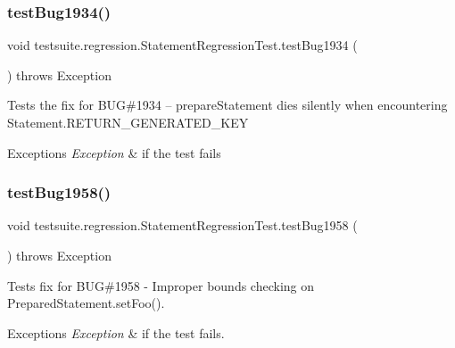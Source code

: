 \subsubsection{\texorpdfstring{test\+Bug1934()}{testBug1934()}}
{\footnotesize\ttfamily void testsuite.\+regression.\+Statement\+Regression\+Test.\+test\+Bug1934 (\begin{DoxyParamCaption}{ }\end{DoxyParamCaption}) throws Exception}

Tests the fix for B\+UG\#1934 -- prepare\+Statement dies silently when encountering Statement.\+R\+E\+T\+U\+R\+N\+\_\+\+G\+E\+N\+E\+R\+A\+T\+E\+D\+\_\+\+K\+EY


\begin{DoxyExceptions}{Exceptions}
{\em Exception} & if the test fails \\
\hline
\end{DoxyExceptions}
\mbox{\label{classtestsuite_1_1regression_1_1_statement_regression_test_a83011075c00abbedc8e7d79f2ffb6661}} 
\subsubsection{\texorpdfstring{test\+Bug1958()}{testBug1958()}}
{\footnotesize\ttfamily void testsuite.\+regression.\+Statement\+Regression\+Test.\+test\+Bug1958 (\begin{DoxyParamCaption}{ }\end{DoxyParamCaption}) throws Exception}

Tests fix for B\+UG\#1958 -\/ Improper bounds checking on Prepared\+Statement.\+set\+Foo().


\begin{DoxyExceptions}{Exceptions}
{\em Exception} & if the test fails. \\
\hline
\end{DoxyExceptions}
\mbox{\label{classtestsuite_1_1regression_1_1_statement_regression_test_a8b65f0d094f2bb8f3e1fc9d4181c956c}} 
